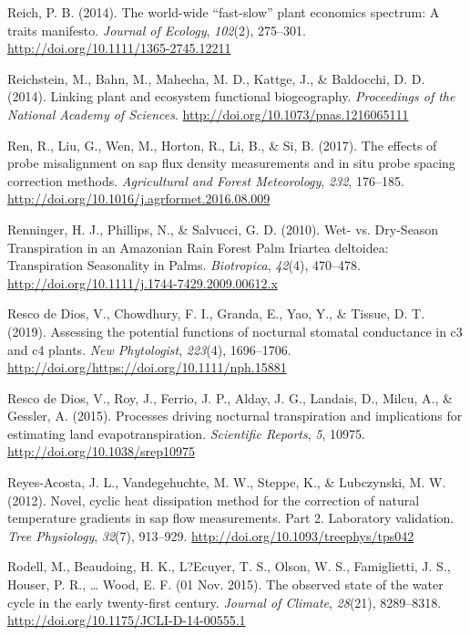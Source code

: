 \documentclass[11pt,twoside]{reedthesis}
\begin{document}
\hypertarget{ref-reich_world-wide_2014}{}
Reich, P. B. (2014). The world-wide ``fast-slow'' plant economics
spectrum: A traits manifesto. \emph{Journal of Ecology}, \emph{102}(2),
275--301. \url{http://doi.org/10.1111/1365-2745.12211}

\hypertarget{ref-Reichstein2014}{}
Reichstein, M., Bahn, M., Mahecha, M. D., Kattge, J., \& Baldocchi, D.
D. (2014). Linking plant and ecosystem functional biogeography.
\emph{Proceedings of the National Academy of Sciences}.
\url{http://doi.org/10.1073/pnas.1216065111}

\hypertarget{ref-Ren2017}{}
Ren, R., Liu, G., Wen, M., Horton, R., Li, B., \& Si, B. (2017). The
effects of probe misalignment on sap flux density measurements and in
situ probe spacing correction methods. \emph{Agricultural and Forest
Meteorology}, \emph{232}, 176--185.
\url{http://doi.org/10.1016/j.agrformet.2016.08.009}

\hypertarget{ref-renninger2010}{}
Renninger, H. J., Phillips, N., \& Salvucci, G. D. (2010). Wet- vs.
Dry-Season Transpiration in an Amazonian Rain Forest Palm Iriartea
deltoidea: Transpiration Seasonality in Palms. \emph{Biotropica},
\emph{42}(4), 470--478.
\url{http://doi.org/10.1111/j.1744-7429.2009.00612.x}

\hypertarget{ref-RescodeDios2019}{}
Resco de Dios, V., Chowdhury, F. I., Granda, E., Yao, Y., \& Tissue, D.
T. (2019). Assessing the potential functions of nocturnal stomatal
conductance in c3 and c4 plants. \emph{New Phytologist}, \emph{223}(4),
1696--1706. \url{http://doi.org/https://doi.org/10.1111/nph.15881}

\hypertarget{ref-rescodedios2015}{}
Resco de Dios, V., Roy, J., Ferrio, J. P., Alday, J. G., Landais, D.,
Milcu, A., \& Gessler, A. (2015). Processes driving nocturnal
transpiration and implications for estimating land evapotranspiration.
\emph{Scientific Reports}, \emph{5}, 10975.
\url{http://doi.org/10.1038/srep10975}

\hypertarget{ref-Reyes-Acosta2012}{}
Reyes-Acosta, J. L., Vandegehuchte, M. W., Steppe, K., \& Lubczynski, M.
W. (2012). Novel, cyclic heat dissipation method for the correction of
natural temperature gradients in sap flow measurements. Part 2.
Laboratory validation. \emph{Tree Physiology}, \emph{32}(7), 913--929.
\url{http://doi.org/10.1093/treephys/tps042}

\hypertarget{ref-Rodell2015}{}
Rodell, M., Beaudoing, H. K., L?Ecuyer, T. S., Olson, W. S.,
Famiglietti, J. S., Houser, P. R., \ldots{} Wood, E. F. (01 Nov. 2015).
The observed state of the water cycle in the early twenty-first century.
\emph{Journal of Climate}, \emph{28}(21), 8289--8318.
\url{http://doi.org/10.1175/JCLI-D-14-00555.1}
\end{document}
